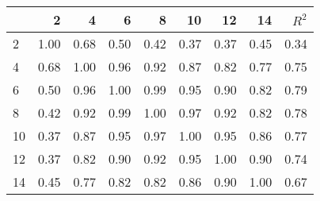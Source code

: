 \begin{tabular}{lrrrrrrrr}
\toprule
{} &     2 &     4 &     6 &     8 &    10 &    12 &    14 &  $R^2$ \\
\midrule
2  &  1.00 &  0.68 &  0.50 &  0.42 &  0.37 &  0.37 &  0.45 &   0.34 \\
4  &  0.68 &  1.00 &  0.96 &  0.92 &  0.87 &  0.82 &  0.77 &   0.75 \\
6  &  0.50 &  0.96 &  1.00 &  0.99 &  0.95 &  0.90 &  0.82 &   0.79 \\
8  &  0.42 &  0.92 &  0.99 &  1.00 &  0.97 &  0.92 &  0.82 &   0.78 \\
10 &  0.37 &  0.87 &  0.95 &  0.97 &  1.00 &  0.95 &  0.86 &   0.77 \\
12 &  0.37 &  0.82 &  0.90 &  0.92 &  0.95 &  1.00 &  0.90 &   0.74 \\
14 &  0.45 &  0.77 &  0.82 &  0.82 &  0.86 &  0.90 &  1.00 &   0.67 \\
\bottomrule
\end{tabular}
